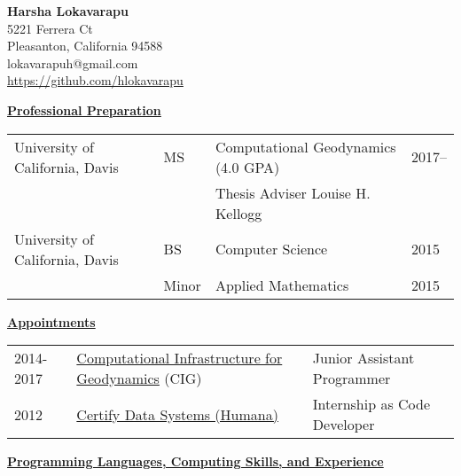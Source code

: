 \documentclass[11pt]{ltxdoc}
\begin{document}
\begin{center}
  \textbf{Harsha Lokavarapu}      \\ [06pt]
  5221 Ferrera Ct                 \\
  Pleasanton, California 94588    \\
  lokavarapuh@gmail.com           \\
  \href{https://github.com/hlokavarapu}{https://github.com/hlokavarapu} \\ [3pt]
\end{center}


\vskip 12pt

\begin{center}
	\textbf{\underline{Professional Preparation}}
\end{center}

\vskip -06pt

\begin{tabular}{llll}
University of California, Davis              &MS       &Computational Geodynamics (4.0 GPA)      & 2017-- \\
                                             &       &Thesis Adviser Louise H. Kellogg           &  \\
University of California, Davis              &BS      & Computer Science                         & 2015       \\
                                             &Minor   & Applied Mathematics                      & 2015
\end{tabular}

\vskip 18pt

\begin{center}
	\textbf{\underline{Appointments}}
\end{center}

\begin{tabular}{lll}
2014-2017     & \href{https://geodynamics.org/cig/}{Computational Infrastructure for Geodynamics} (CIG) & Junior Assistant Programmer \\
2012       & \href{https://www.humana.com}{Certify Data Systems (Humana)} & Internship as Code Developer
\end{tabular}

\vskip 18pt

\begin{center}
	\textbf{\underline{Programming Languages, Computing Skills, and Experience}}
\end{center}
\end{document}
